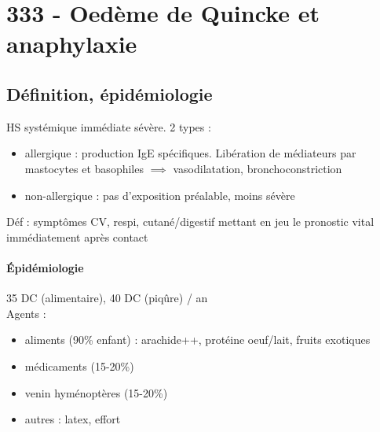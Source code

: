 \section{333 - Oedème de Quincke et anaphylaxie}%
\label{sec:333_oedeme_de_quincke_et_anaphylaxie}

\subsection{Définition, épidémiologie}
HS systémique immédiate sévère. 2 types :
\begin{itemize}
\item allergique : production IgE spécifiques. Libération de médiateurs par
  mastocytes et basophiles $\implies$ vasodilatation, bronchoconstriction
\item non-allergique : pas d'exposition préalable, moins sévère 
\end{itemize}
Déf : symptômes CV, respi, cutané/digestif mettant en
jeu le pronostic vital immédiatement après contact

\paragraph{Épidémiologie}
35 DC (alimentaire), 40 DC (piqûre) / an\\
Agents :
\begin{itemize}
\item aliments (90\% enfant) : arachide++, protéine oeuf/lait, fruits exotiques
\item médicaments (15-20\%)
\item venin hyménoptères (15-20\%)
\item autres : latex, effort
\end{itemize}

